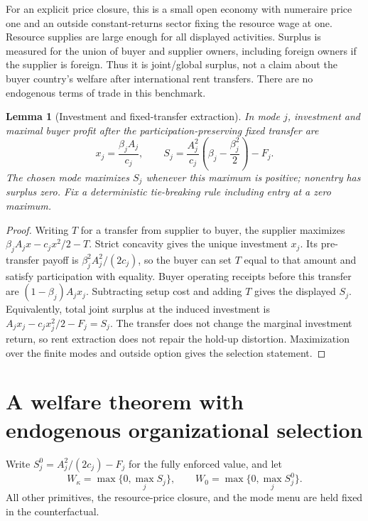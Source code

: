 \documentclass[11pt,a4paper]{article}
\newtheorem{lemma}[theorem]{Lemma}
\theoremstyle{definition}
\theoremstyle{remark}
\begin{document}
For an explicit price closure, this is a small open economy with numeraire price one and an outside constant-returns sector fixing the resource wage at one. Resource supplies are large enough for all displayed activities. Surplus is measured for the union of buyer and supplier owners, including foreign owners if the supplier is foreign. Thus it is joint/global surplus, not a claim about the buyer country's welfare after international rent transfers. There are no endogenous terms of trade in this benchmark.

\begin{lemma}[Investment and fixed-transfer extraction]\label{le:investment}
In mode $j$, investment and maximal buyer profit after the participation-preserving fixed transfer are
\[
 x_j=\frac{\beta_jA_j}{c_j},\qquad
 S_j=\frac{A_j^2}{c_j}\left(\beta_j-\frac{\beta_j^2}{2}\right)-F_j.
\]
The chosen mode maximizes $S_j$ whenever this maximum is positive; nonentry has surplus zero. Fix a deterministic tie-breaking rule including entry at a zero maximum.
\end{lemma}
\begin{proof}
Writing $T$ for a transfer from supplier to buyer, the supplier maximizes $\beta_jA_jx-c_jx^2/2-T$. Strict concavity gives the unique investment $x_j$. Its pre-transfer payoff is $\beta_j^2A_j^2/(2c_j)$, so the buyer can set $T$ equal to that amount and satisfy participation with equality. Buyer operating receipts before this transfer are $(1-\beta_j)A_jx_j$. Subtracting setup cost and adding $T$ gives the displayed $S_j$. Equivalently, total joint surplus at the induced investment is $A_jx_j-c_jx_j^2/2-F_j=S_j$. The transfer does not change the marginal investment return, so rent extraction does not repair the hold-up distortion. Maximization over the finite modes and outside option gives the selection statement.
\end{proof}

\section{A welfare theorem with endogenous organizational selection}
Write $S_j^0=A_j^2/(2c_j)-F_j$ for the fully enforced value, and let
\[
 W_\kappa=\max\{0,\max_jS_j\},\qquad
 W_0=\max\{0,\max_jS_j^0\}.
\]
All other primitives, the resource-price closure, and the mode menu are held fixed in the counterfactual.
\end{document}
